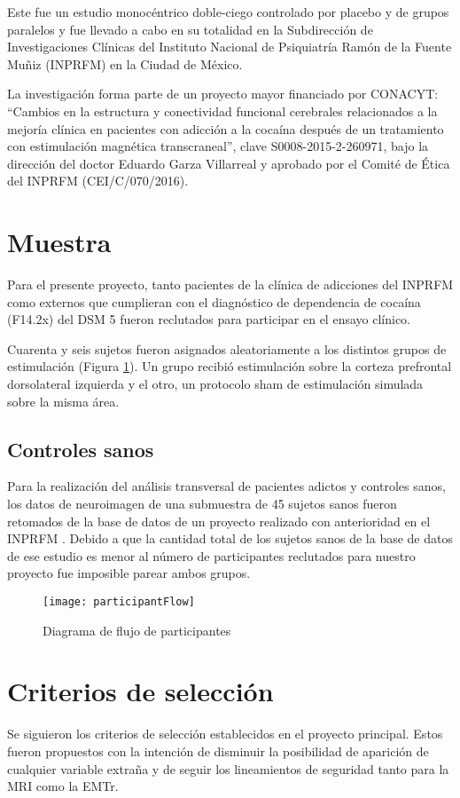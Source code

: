 Este fue un estudio monocéntrico doble-ciego controlado por placebo y de grupos paralelos y fue llevado a cabo en su totalidad en la Subdirección de Investigaciones Clínicas del Instituto Nacional de Psiquiatría Ramón de la Fuente Muñiz (INPRFM) en la Ciudad de México.\par
La investigación forma parte de un proyecto mayor financiado por CONACYT:
``Cambios en la estructura y conectividad funcional cerebrales relacionados a la mejoría clínica en pacientes con adicción a la cocaína después de un tratamiento con estimulación magnética transcraneal'',
clave S0008-2015-2-260971, bajo la dirección del doctor Eduardo Garza Villarreal y aprobado por el Comité de Ética del INPRFM (CEI/C/070/2016).

\section{Muestra}
Para el presente proyecto, tanto pacientes de la clínica de adicciones del INPRFM como externos que cumplieran con el diagnóstico de dependencia de cocaína (F14.2x) del DSM 5 \parencite{APA2013} fueron reclutados para participar en el ensayo clínico.\par
Cuarenta y seis sujetos fueron asignados aleatoriamente a los distintos grupos de estimulación (Figura \ref{fig:flow}).
Un grupo recibió estimulación sobre la corteza prefrontal dorsolateral izquierda y el otro, un protocolo sham de estimulación simulada sobre la misma área.

\subsection{Controles sanos}
Para la realización del análisis transversal de pacientes adictos y controles sanos, los datos de neuroimagen de una submuestra de 45 sujetos sanos fueron retomados de la base de datos de un proyecto realizado con anterioridad en el INPRFM \parencite{Garza2017}.
Debido a que la cantidad total de los sujetos sanos de la base de datos de ese estudio es menor al número de participantes reclutados para nuestro proyecto fue imposible parear ambos grupos.

\begin{figure}[H]
    \centering
    \texttt{[image: participantFlow]}
    \caption{Diagrama de flujo de participantes}
    \label{fig:flow}
\end{figure}

\section{Criterios de selección}
Se siguieron los criterios de selección establecidos en el proyecto principal.
Estos fueron propuestos con la intención de disminuir la posibilidad de aparición de cualquier variable extraña y de seguir los lineamientos de seguridad tanto para la MRI como la EMTr.

